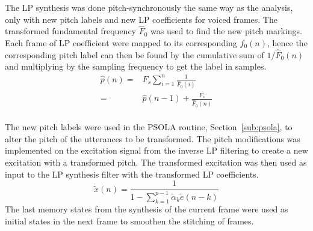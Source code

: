 The LP synthesis was done pitch-synchronously the same way as the analysis, only with new pitch labels and new LP coefficients for voiced frames. The transformed fundamental frequency $\hat{F}_0$ was used to find the new pitch markings. Each frame of LP coefficient were mapped to its corresponding $f_0(n)$, hence the corresponding pitch label can then be found by the cumulative sum of $1/\hat{F}_0(n)$ and multiplying by the sampling frequency to get the label in samples.
\begin{equation}
	\begin{split}
		\hat{p}(n) =& F_s \sum_{i=1}^{n}\frac{1}{\hat{F}_0(i)} \\
		 =& \hat{p}(n-1) + \frac{F_s}{\hat{F}_0(n)} \\
	\end{split}
\end{equation}

The new pitch labels were used in the PSOLA routine, Section~\ref{sub:psola}, to alter the pitch of the utterances to be transformed. The pitch modifications was implemented on the excitation signal from the inverse LP filtering to create a new excitation with a transformed pitch. The transformed excitation was then used as input to the LP synthesis filter with the transformed LP coefficients. 
\begin{equation}
	\tilde{x}(n) = \frac{1}{1 - \sum_{k=1}^{p-1} \tilde{\alpha}_k \tilde{e}(n-k)}
\end{equation}
The last memory states from the synthesis of the current frame were used as initial states in the next frame to smoothen the stitching of frames.





